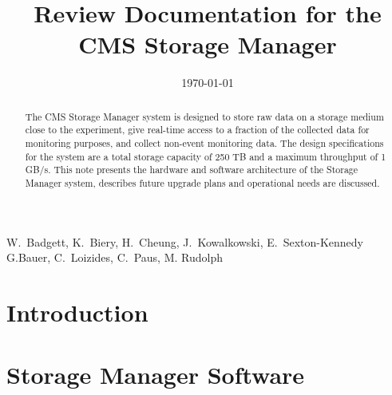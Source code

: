 \documentclass{cmspaper}
\begin{document}

\begin{titlepage}

   \date{\today}

  \title{Review Documentation for the\\ CMS Storage Manager}

  \begin{Authlist}
    W.~Badgett, K.~Biery, H.~Cheung, J.~Kowalkowski, 
    E.~Sexton-Kennedy
    G.Bauer, C.~Loizides, C.~Paus, M. Rudolph 
  \end{Authlist}



  \begin{abstract}
The CMS Storage Manager system is designed to store raw data on a storage medium close to the
experiment, give real-time access to a fraction of the collected data for monitoring purposes, and
collect non-event monitoring data. The design specifications for the system are a total storage capacity
of 250 TB and a maximum throughput of 1 GB/s. This note presents the hardware and software
architecture of  the Storage Manager system, describes future upgrade plans and operational 
needs are discussed. 
  \end{abstract} 

  
\end{titlepage}

\setcounter{page}{2}%
\section{Introduction}    %


\section{Storage Manager Software}  %



\end{document}

